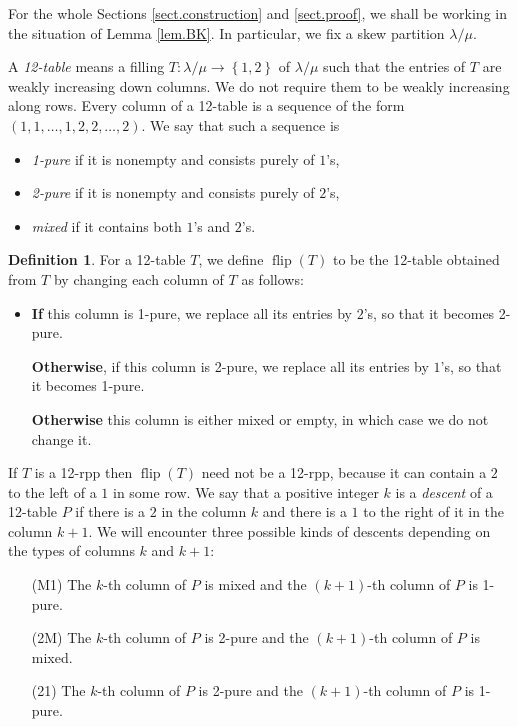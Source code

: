 \documentclass[12pt]{article}
\theoremstyle{plain}
\theoremstyle{definition}
\newtheorem{definition}[theorem]{Definition}
\def\lm{{\lambda/\mu}}
\def\flip{{\operatorname{flip}}}
\begin{document}
For the whole Sections \ref{sect.construction} and \ref{sect.proof},
we shall be working in the situation of Lemma \ref{lem.BK}. In
particular, we fix a skew partition $\lm$.

A \textit{12-table} means a filling $T:\lm\rightarrow\left\{  1,2\right\}  $
of $\lm$
such that the entries of $T$ are weakly increasing down columns. We do not
require them to be weakly increasing along rows. Every column of a 12-table
is a sequence of the form $(1,1,\ldots,1,2,2,\ldots,2)$. We say that such a sequence is

\begin{itemize}
\item \textit{1-pure} if it is nonempty and consists purely of $1$'s,

\item \textit{2-pure} if it is nonempty and consists purely of $2$'s,

\item \textit{mixed} if it contains both $1$'s and $2$'s.
\end{itemize}

\def\flip{{\operatorname*{flip}}}

\begin{definition}
 \label{defi.flip}
For a 12-table $T$, we define $\flip(T)$ to be the 12-table obtained from $T$ by changing each column of $T$ as follows:

\begin{itemize}
\item \textbf{If} this column is 1-pure, we replace all its entries by $2$'s, so that it becomes 2-pure.

\textbf{Otherwise}, if this column is 2-pure, we replace all its entries by
$1$'s, so that it becomes 1-pure.

\textbf{Otherwise} this column is either mixed or empty, in which case we do not change it.
\end{itemize}

\end{definition}


If $T$ is a 12-rpp then $\flip(T)$ need not be a 12-rpp, because it can contain a $2$ to the left of a $1$ in some row. We say that a positive integer $k$ is a \textit{descent} of a 12-table $P$ if there is a $2$ in the column $k$ and there is a $1$ to the right of it in the column $k+1$. We will encounter three possible kinds of descents depending on the types of columns $k$ and $k+1$:

\begin{itemize}
\item[(M1)] The $k$-th column of $P$ is mixed and the $\left(  k+1\right)  $-th column of $P$ is 1-pure.

\item[(2M)] The $k$-th column of $P$ is 2-pure and the $\left(  k+1\right)  $-th column of $P$ is mixed.

\item[(21)] The $k$-th column of $P$ is 2-pure and the $\left(  k+1\right)  $-th column of $P$ is 1-pure.
\end{itemize}
\end{document}
